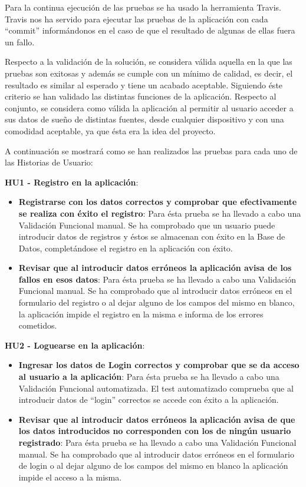 \documentclass[11pt,openany]{book}
\begin{document}
Para la continua ejecución de las pruebas se ha usado la herramienta Travis. Travis nos ha servido para ejecutar las pruebas de la aplicación con cada ``commit'' informándonos en el caso de que el resultado de algunas de ellas fuera un fallo.

Respecto a la validación de la solución, se considera válida aquella en la que las pruebas son exitosas y además se cumple con un mínimo de calidad, es decir, el resultado es similar al esperado y tiene un acabado aceptable. Siguiendo éste criterio se han validado las distintas funciones de la aplicación. Respecto al conjunto, se considera como válida la aplicación al permitir al usuario acceder a sus datos de sueño de distintas fuentes, desde cualquier dispositivo y con una comodidad aceptable, ya que ésta era la idea del proyecto.

A continuación se mostrará como se han realizados las pruebas para cada uno de las Historias de Usuario:

\textbf{HU1 - Registro en la aplicación}:

\begin{itemize}
\item\textbf{Registrarse con los datos correctos y comprobar que efectivamente se realiza con éxito el registro}: Para ésta prueba se ha llevado a cabo una Validación Funcional manual. Se ha comprobado que un usuario puede introducir datos de registros y éstos se almacenan con éxito en la Base de Datos, completándose el registro en la aplicación con éxito.
\item\textbf{Revisar que al introducir datos erróneos la aplicación avisa de los fallos en esos datos}: Para ésta prueba se ha llevado a cabo una Validación Funcional manual. Se ha comprobado que al introducir datos erróneos en el formulario del registro o al dejar alguno de los campos del mismo en blanco, la aplicación impide el registro en la misma e informa de los errores cometidos.
\end{itemize}
 
\textbf{HU2 - Loguearse en la aplicación}:

\begin{itemize}
\item\textbf{Ingresar los datos de Login correctos y comprobar que se da acceso al usuario a la aplicación}: Para ésta prueba se ha llevado a cabo una Validación Funcional automatizada. El test automatizado comprueba que al introducir datos de ``login'' correctos se accede con éxito a la aplicación.
\item\textbf{Revisar que al introducir datos erróneos la aplicación avisa de que los datos introducidos no corresponden con los de ningún usuario registrado}: Para ésta prueba se ha llevado a cabo una Validación Funcional manual. Se ha comprobado que al introducir datos erróneos en el formulario de login o al dejar alguno de los campos del mismo en blanco la aplicación impide el acceso a la misma.
\end{itemize}
 
\end{document}
